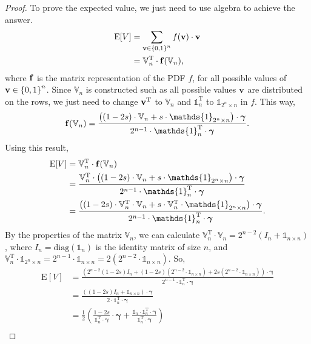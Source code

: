 \documentclass{article}
\newcommand{\0}{\mathbbold{0}}
\newcommand{\1}{\mathds{1}}
\newcommand{\2}{\mathbbold{2}}
\newcommand{\V}{\mathbb{V}}
\newcommand{\T}{^{\operatorname{T}}}
\newcommand{\diag}[1]{\text{diag}\!\left(#1\right)}
\begin{document}
\begin{proof}
    To prove the expected value, we just need to use algebra to achieve the answer. 
    \begin{align*}
        \text{E}[V] &= \sum_{{\bf v} \in \left\{0,1\right\}^n} f({\bf v})\cdot {\bf v} \\
        &= \V_n\T \cdot {\bf f}(\V_n),
    \end{align*}
    where ${\bf f}$ is the matrix representation of the PDF $f$, for all possible values of ${\bf v} \in \left\{0,1\right\}^n$. Since $\V_n$ is constructed such as all possible values ${\bf v}$ are distributed on the rows, we just need to change ${\bf v}\T$ to $\V_n$ and $\1_n\T$ to $\1_{2^n\times n}$ in $f$. This way,
    \begin{equation*}
        {\bf f}(\V_n) = \frac{\left(\left(1-2s\right) \cdot \V_n + s\cdot\1_{2^n\times n}\right)\cdot {\boldsymbol \gamma} }{2^{n-1}\cdot \1_n\T \cdot {\boldsymbol \gamma}}.
    \end{equation*}
    Using this result,
    \begin{align*}
        \text{E}[V] &= \V_n\T \cdot {\bf f}(\V_n) \\
        &= \frac{\V_n\T \cdot \left(\left(1-2s\right) \cdot \V_n + s\cdot\1_{2^n\times n}\right)\cdot {\boldsymbol \gamma} }{2^{n-1}\cdot \1_n\T \cdot {\boldsymbol \gamma}} \\
        &= \frac{\left(\left(1-2s\right) \cdot \V_n\T \cdot  \V_n + s\cdot\V_n\T \cdot \1_{2^n\times n}\right)\cdot {\boldsymbol \gamma} }{2^{n-1}\cdot \1_n\T \cdot {\boldsymbol \gamma}}.
    \end{align*}
    By the properties of the matrix $\V_n$, we can calculate $\V_n\T\cdot\V_n = 2^{n-2}\left(I_n + \1_{n\times n}\right) $, where $I_n = \diag{\1_n}$ is the identity matrix of size $n$, and $\V_n\T\cdot\1_{2^n\times n} = 2^{n-1}\cdot\1_{n\times n} = 2\left(2^{n-2}\cdot\1_{n\times n}\right) $. So,
    \begin{align*}
        \text{E}[V] &= \frac{\left(2^{n-2}(1-2s)I_n + (1-2s)\left(2^{n-2}\cdot\1_{n\times n}\right) + 2s\left(2^{n-2}\cdot\1_{n\times n}\right) \right)\cdot {\boldsymbol \gamma} }{2^{n-1}\cdot \1_n\T \cdot {\boldsymbol \gamma}} \\
        &= \frac{\left((1-2s)I_n + \1_{n\times n}\right) \cdot {\boldsymbol \gamma}}{2\cdot \1_n\T \cdot {\boldsymbol \gamma}} \\
        &= \frac{1}{2}\left(\frac{1-2s}{\1_n\T \cdot {\boldsymbol \gamma}}\cdot {\boldsymbol \gamma} + \frac{\1_n\cdot\1_n\T\cdot {\boldsymbol \gamma}}{\1_n\T\cdot {\boldsymbol \gamma}}\right)  \\

\end{align*}
\end{proof}
\end{document}
